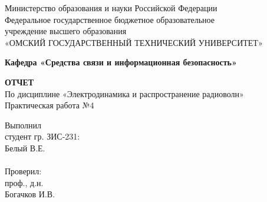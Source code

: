 \documentclass[fontsize=14pt,a4paper]{scrartcl}
\begin{document}
  \begin{titlepage}                                                         
    \newpage                                                                        
    \begin{center}   
      Министерство образования и науки Российской Федерации  \\ 
      \vspace{1em}                                                    
      {\mdseries
        Федеральное государственное бюджетное образовательное \\
        учреждение высшего образования \\
        «ОМСКИЙ ГОСУДАРСТВЕННЫЙ ТЕХНИЧЕСКИЙ УНИВЕРСИТЕТ»
      }                               
      \vspace{1em}      

      {\bfseries Кафедра «Средства связи и информационная безопасность»}  

      \vspace{\fill}                                                         
                                   
      {\bfseries ОТЧЕТ } \\                                 
      По дисциплине «Электродинамика и распространение радиоволн» \\ 
      \vspace{1em} 
      Практическая работа №4 \\                                                           
    \end{center}                                                          
                                                                                        
    \vspace{\fill}                                                         
                                                                                        
    \hfill\parbox{5cm}{
      Выполнил\\
      студент гр. ЗИС-231:\\
      Белый В.Е. \\
      \\
      Проверил:\\
      проф., д.н. \\
      Богачков И.В.\\
    }                                                                                                                              
                                                                                                                                                                              

\end{titlepage}
\end{document}
